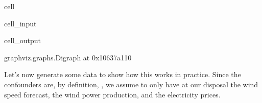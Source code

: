 \documentclass[letterpaper,10pt,english]{jupyterBook}
\begin{document}
\begin{sphinxuseclass}{cell}
\begin{sphinxVerbatimInput}
\begin{sphinxuseclass}{cell_input}
\end{sphinxuseclass}\end{sphinxVerbatimInput}
\begin{sphinxVerbatimOutput}

\begin{sphinxuseclass}{cell_output}
\begin{sphinxVerbatim}[commandchars=\\\{\}]
\PYGZlt{}graphviz.graphs.Digraph at 0x10637a110\PYGZgt{}
\end{sphinxVerbatim}

\end{sphinxuseclass}\end{sphinxVerbatimOutput}

\end{sphinxuseclass}
\sphinxAtStartPar
Let’s now generate some data to show how this works in practice. Since the confounders are, by definition, , we assume to only have at our disposal the wind speed forecast, the wind power production, and the electricity prices.
\end{document}
